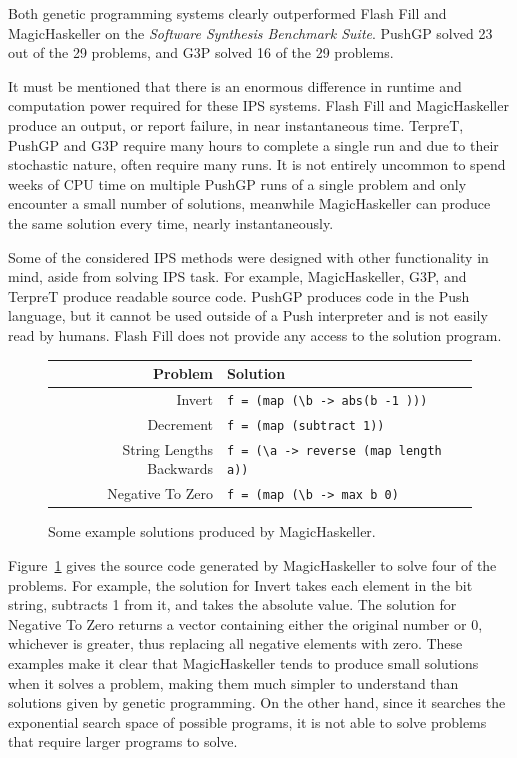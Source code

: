 Both genetic programming systems clearly outperformed Flash Fill and MagicHaskeller on the \emph{Software Synthesis Benchmark Suite}. PushGP solved  23 out of the 29 problems, and G3P solved 16 of the 29 problems.

It must be mentioned that there is an enormous difference in runtime and computation power required for these IPS systems. Flash Fill and MagicHaskeller produce an output, or report failure, in near instantaneous time. TerpreT, PushGP  and G3P require many hours to complete a single run and due to their stochastic nature, often require many runs. It is not entirely uncommon to spend weeks of CPU time on multiple PushGP runs of a single problem and only encounter a small number of solutions, meanwhile MagicHaskeller can produce the same solution every time, nearly instantaneously. 

Some of the considered IPS methods were designed with other functionality in mind, aside from solving IPS task. For example, MagicHaskeller, G3P, and TerpreT produce readable source code. PushGP produces code in the Push language, but it cannot be used outside of a Push interpreter and is not easily read by humans. Flash Fill does not provide any access to the solution program.

\begin{figure}
\begin{tabular}{ r | l }
\textbf{Problem} & \textbf{Solution} \\
\hline
Invert & \texttt{f = (map (\textbackslash b -> abs(b -1 )))} \\
Decrement & \texttt{f = (map (subtract 1))} \\ 
String Lengths Backwards & \texttt{f = (\textbackslash a -> reverse (map length a))} \\
Negative To Zero & \texttt{f = (map (\textbackslash b -> max b 0)} \\
\end{tabular}
\caption{Some example solutions produced by MagicHaskeller.}
\label{fig:MHsolutions}
\end{figure}

Figure~\ref{fig:MHsolutions} gives the source code generated by MagicHaskeller to solve four of the problems. For example, the solution for Invert takes each element in the bit string, subtracts 1 from it, and takes the absolute value. The solution for Negative To Zero returns a vector containing either the original number or 0, whichever is greater, thus replacing all negative elements with zero. These examples make it clear that MagicHaskeller tends to produce small solutions when it solves a problem, making them much simpler to understand than solutions given by genetic programming. On the other hand, since it searches the exponential search space of possible programs, it is not able to solve problems that require larger programs to solve.


